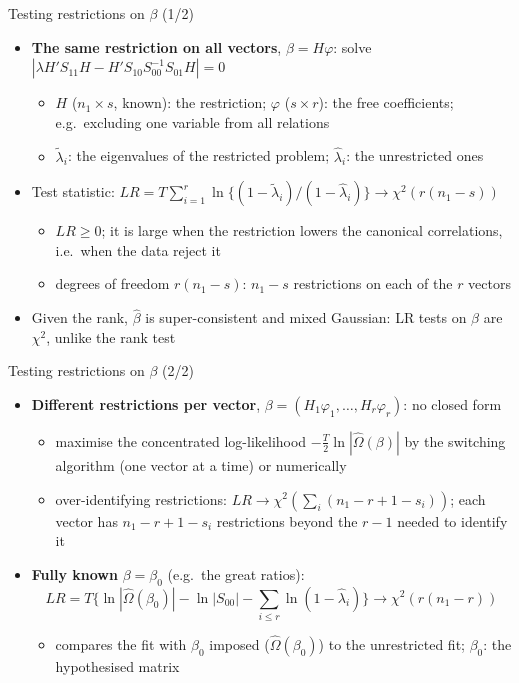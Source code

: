 \begin{frame}{Testing restrictions on $\beta$ (1/2)}
\itemsize{\small}
\begin{itemize}
    \item \textbf{The same restriction on all vectors}, $\beta = H\varphi$: solve $|\lambda H'S_{11}H - H'S_{10}S_{00}^{-1}S_{01}H| = 0$
    \begin{itemize}
        \item $H$ ($n_1\times s$, known): the restriction; $\varphi$ ($s\times r$): the free coefficients; e.g.\ excluding one variable from all relations
        \item $\tilde\lambda_i$: the eigenvalues of the restricted problem; $\hat\lambda_i$: the unrestricted ones
    \end{itemize}
    \item Test statistic: $LR = T\sum_{i=1}^r\ln\{(1 - \tilde\lambda_i)/(1 - \hat\lambda_i)\} \to \chi^2(r(n_1 - s))$
    \begin{itemize}
        \item $LR \ge 0$; it is large when the restriction lowers the canonical correlations, i.e.\ when the data reject it
        \item degrees of freedom $r(n_1 - s)$: $n_1 - s$ restrictions on each of the $r$ vectors
    \end{itemize}
    \item Given the rank, $\hat\beta$ is super-consistent and mixed Gaussian: LR tests on $\beta$ are $\chi^2$, unlike the rank test 
\end{itemize}
\end{frame}

\begin{frame}{Testing restrictions on $\beta$ (2/2)}
\itemsize{\small}
\begin{itemize}
    \item \textbf{Different restrictions per vector}, $\beta = (H_1\varphi_1, \dots, H_r\varphi_r)$: no closed form
    \begin{itemize}
        \item maximise the concentrated log-likelihood $-\tfrac{T}{2}\ln|\hat\Omega(\beta)|$ by the switching algorithm (one vector at a time) or numerically
        \item over-identifying restrictions: $LR \to \chi^2(\sum_i(n_1 - r + 1 - s_i))$; each vector has $n_1 - r + 1 - s_i$ restrictions beyond the $r - 1$ needed to identify it
    \end{itemize}
    \item \textbf{Fully known} $\beta = \beta_0$ (e.g.\ the great ratios): \[ LR = T\Big\{\ln|\hat\Omega(\beta_0)| - \ln|S_{00}| - \sum_{i\le r}\ln(1 - \hat\lambda_i)\Big\} \to \chi^2(r(n_1 - r)) \]
    \begin{itemize}
        \item compares the fit with $\beta_0$ imposed ($\hat\Omega(\beta_0)$) to the unrestricted fit; $\beta_0$: the hypothesised matrix
    \end{itemize}
\end{itemize}
\end{frame}

